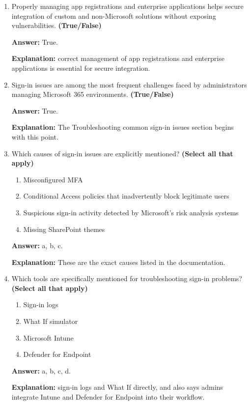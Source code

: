 \documentclass[10pt]{article}
\begin{document}
\begin{enumerate}[leftmargin=*]
\textbf{Explanation:} These are the exact benefits assigned to proactive monitoring in the introduction.

\item Properly managing app registrations and enterprise applications helps secure integration of custom and non-Microsoft solutions without exposing vulnerabilities. \textbf{(True/False)}

\textbf{Answer:} True.

\textbf{Explanation:} correct management of app registrations and enterprise applications is essential for secure integration.

\item Sign-in issues are among the most frequent challenges faced by administrators managing Microsoft 365 environments. \textbf{(True/False)}

\textbf{Answer:} True.

\textbf{Explanation:} The Troubleshooting common sign-in issues section begins with this point.

\item Which causes of sign-in issues are explicitly mentioned? \textbf{(Select all that apply)}
\begin{enumerate}[label=\alph*., leftmargin=1.5em]
\item Misconfigured MFA
\item Conditional Access policies that inadvertently block legitimate users
\item Suspicious sign-in activity detected by Microsoft’s risk analysis systems
\item Missing SharePoint themes
\end{enumerate}
\textbf{Answer:} a, b, c.

\textbf{Explanation:} These are the exact causes listed in the documentation.

\item Which tools are specifically mentioned for troubleshooting sign-in problems? \textbf{(Select all that apply)}
\begin{enumerate}[label=\alph*., leftmargin=1.5em]
\item Sign-in logs
\item What If simulator
\item Microsoft Intune
\item Defender for Endpoint
\end{enumerate}
\textbf{Answer:} a, b, c, d.

\textbf{Explanation:} sign-in logs and What If directly, and also says admins integrate Intune and Defender for Endpoint into their workflow.


\end{enumerate}
\end{document}
